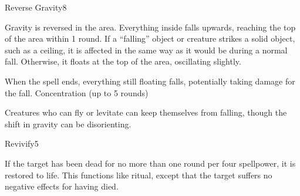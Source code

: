 \begin{spellsection}{Reverse Gravity}{8}
    \begin{spellheader}
    \end{spellheader}
    \begin{spellcontent}
        \begin{spelltargetinginfo}
        \end{spelltargetinginfo}
        \begin{spelleffects}
            \spelleffect Gravity is reversed in the area. Everything inside falls upwards, reaching the top of the area within 1 round. If a ``falling'' object or creature strikes a solid object, such as a ceiling, it is affected in the same way as it would be during a normal fall. Otherwise, it floats at the top of the area, oscillating slightly.

            When the spell ends, everything still floating falls, potentially taking damage for the fall.
            \spelldur Concentration (up to 5 rounds)
        \end{spelleffects}
    \end{spellcontent}
    \begin{spellfooter}
        \spellnotes Creatures who can fly or levitate can keep themselves from falling, though the shift in gravity can be disorienting.
        \miscastyou
    \end{spellfooter}
\end{spellsection}

\begin{spellsection}{Revivify}{5}
    \begin{spellheader}
    \end{spellheader}
    \begin{spellcontent}
        \begin{spelltargetinginfo}
        \end{spelltargetinginfo}
        \begin{spelleffects}
            \spelleffect If the target has been dead for no more than one round per four spellpower, it is restored to life. This functions like  ritual, except that the target suffers no negative effects for having died.
        \end{spelleffects}
    \end{spellcontent}
    \begin{spellfooter}
        \miscastexplode
    \end{spellfooter}
\end{spellsection}

